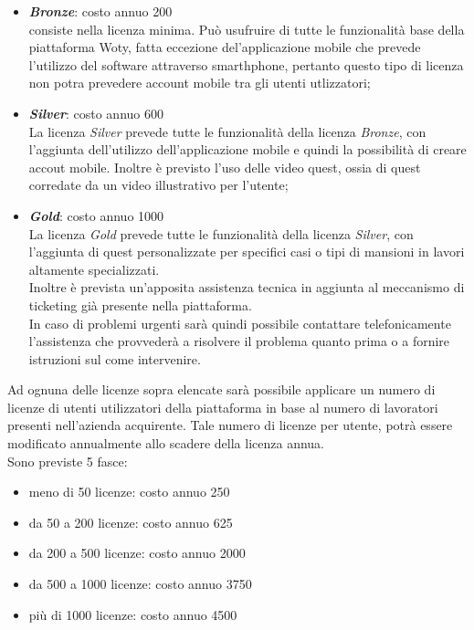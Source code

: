 \begin{itemize}
\item \textbf{\textit{Bronze}}: costo annuo 200 \EUR\\
consiste nella licenza minima.
Può usufruire di tutte le funzionalità base della piattaforma Woty, fatta eccezione del'applicazione mobile che prevede l'utilizzo del software attraverso smarthphone, pertanto questo tipo di licenza non potra prevedere account mobile tra gli utenti utlizzatori;


\item \textbf{\textit{Silver}}: costo annuo 600 \EUR\\
La licenza \textit{Silver} prevede tutte le funzionalità della licenza \textit{Bronze}, con l'aggiunta dell'utilizzo dell'applicazione mobile e quindi la possibilità di creare accout mobile.
Inoltre è previsto l'uso delle video quest, ossia di quest corredate da un video illustrativo per l'utente;


\item \textbf{\textit{Gold}}: costo annuo 1000 \EUR\\
La licenza \textit{Gold} prevede tutte le funzionalità della licenza \textit{Silver}, con l'aggiunta di quest personalizzate per specifici casi o tipi di mansioni in lavori altamente specializzati.\\
Inoltre è prevista un'apposita assistenza tecnica in aggiunta al meccanismo di ticketing già presente nella piattaforma.\\
In caso di problemi urgenti sarà quindi possibile contattare telefonicamente l'assistenza che provvederà a risolvere il problema quanto prima o a fornire istruzioni sul come intervenire.\\

\end{itemize}


Ad ognuna delle licenze sopra elencate sarà possibile applicare un numero di licenze di utenti utilizzatori della piattaforma in base al numero di lavoratori presenti nell'azienda acquirente. Tale numero di licenze per utente, potrà essere modificato annualmente allo scadere della licenza annua.\\
Sono previste 5 fasce:

\begin{itemize}
\item meno di 50 licenze: costo annuo 250 \EUR

\item da 50 a 200 licenze: costo annuo 625 \EUR

\item da 200 a 500 licenze: costo annuo 2000 \EUR

\item da 500 a 1000 licenze: costo annuo 3750 \EUR

\item più di 1000 licenze: costo annuo 4500 \EUR


\end{itemize}





